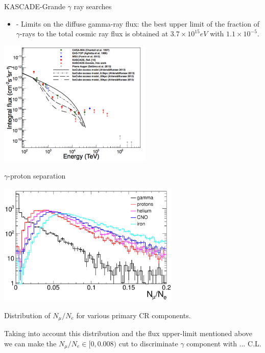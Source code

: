 \begin{frame}{KASCADE-Grande $\gamma$ ray searches}
\begin{itemize}
 \item - Limits on the diffuse gamma-ray flux: the best upper limit of the fraction of $\gamma$-rays
to the total cosmic ray flux is obtained at $3.7 \times 10^{15} eV$ with $1.1 \times 10^{-5}$. 
\end{itemize}

\begin{center}
    \includegraphics[width=0.55\textwidth]{pics/KASCADE-Grande_UHECR2016-2.pdf}
\end{center}
\end{frame}

\begin{frame}{$\gamma$-proton separation}
\small
\vspace{-1em}
\begin{center}
    \includegraphics[width=0.65\textwidth]{pics/Nmu_Ne.pdf}
    
    Distribution of $N_\mu / N_e$ for various primary CR components.
\end{center}
Taking into account this distribution and the flux upper-limit mentioned above we can make the 
$N_\mu/N_e \in [0, 0.008)$ cut to discriminate $\gamma$ component with ... C.L.
\end{frame}

